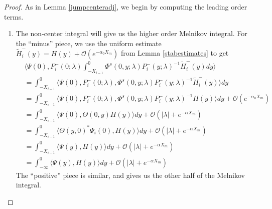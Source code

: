 \documentclass[thesis.tex]{subfiles}
\begin{document}
\begin{lemma}
\begin{proof}
As in Lemma \ref{jumpcenteradj}, we begin by computing the leading order terms.

\begin{enumerate}
\item The non-center integral will give us the higher order Melnikov integral. For the ``minus'' piece, we use the uniform estimate $\tilde{H}_i^-(y) = H(y) + \mathcal{O}(e^{-\alpha_0 X_m})$ from Lemma \ref{stabestimates} to get
\begin{align*}
&\langle \Psi(0), P_i^-(0; \lambda) \int_{-X_{i-1}}^0 \Phi^s(0, y; \lambda) P_i^-(y; \lambda)^{-1} \tilde{H}_i^-(y) dy \rangle \\
&= \int_{-X_{i-1}}^0 \langle \Psi(0), P_i^-(0; \lambda), \Phi^s(0, y; \lambda) P_i^-(y; \lambda)^{-1} \tilde{H}_i^-(y) \rangle dy \\
&= \int_{-X_{i-1}}^0 \langle \Psi(0), P_i^-(0; \lambda), \Phi^s(0, y; \lambda) P_i^-(y; \lambda)^{-1} H(y) \rangle dy + \mathcal{O}({e^{-\alpha_0 X_m}})\\
&= \int_{-X_{i-1}}^0 \langle \Psi(0), \Theta(0, y) H(y) \rangle dy + \mathcal{O}(|\lambda| + {e^{-\alpha X_m}})\\
&= \int_{-X_{i-1}}^0 \langle \Theta(y, 0)^* \Psi_i(0), H(y) \rangle dy + \mathcal{O}(|\lambda| + {e^{-\alpha X_m}})\\
&= \int_{-X_{i-1}}^0 \langle \Psi(y), H(y) \rangle dy + \mathcal{O}(|\lambda| + {e^{-\alpha X_m}})\\
&= \int_{-\infty}^0 \langle \Psi(y), H(y) \rangle dy + \mathcal{O}(|\lambda| + {e^{-\alpha X_m}})
\end{align*}
The ``positive'' piece is similar, and gives us the other half of the Melnikov integral.


\end{enumerate}
\end{proof}
\end{lemma}
\end{document}

